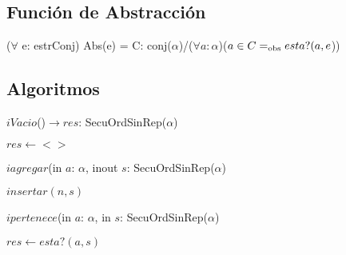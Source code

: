 \subsection*{Funci\'on de Abstracci\'on}
\vspace{11pt}
($\forall$ e: estrConj) Abs(e) = C: conj($\alpha$)/($\forall a:\alpha$)($a\in C=_{\mathrm{obs}} esta?(a,{e}$))
\vspace{33pt}


\subsection*{Algoritmos}

$\textit{i}Vacio$()$\longrightarrow res$: SecuOrdSinRep($\alpha$)\\
\begin{algorithm}[H]
\BlankLine
$res\leftarrow <>$
\end{algorithm}

$\textit{i}agregar$(in $a$: $\alpha$, inout $s$: SecuOrdSinRep($\alpha$)\\
\begin{algorithm}[H]
\BlankLine
$insertar(n,s)$
\end{algorithm}

$ipertenece$(in $a$: $\alpha$, in $s$: SecuOrdSinRep($\alpha$)\\
\begin{algorithm}[H]
\BlankLine
$res\leftarrow esta?(a,s)$
\end{algorithm}